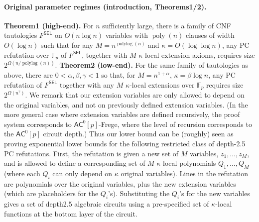 \paragraph{Original parameter regimes (introduction, Theorems1/2).}
\textbf{Theorem1 (high-end).} For $n$ sufficiently large, there is a family of CNF tautologies $F^{\mathsf{SEL}}$ on $O(n\log n)$ variables with $\operatorname{poly}(n)$ clauses of width $O(\log n)$ such that for any $M=n^{\operatorname{polylog}(n)}$ and $\kappa=O(\log\log n)$, any PC refutation over $\mathbb F_p$ of $F^{\mathsf{SEL}}$, together with $M$ $\kappa$-local extension axioms, requires size $2^{\Omega(n/\operatorname{polylog}(n))}$.
\textbf{Theorem2 (low-end).} For the same family of tautologies as above, there are $0<\alpha,\beta,\gamma<1$ so that, for $M=n^{1+\alpha}$, $\kappa=\beta\log n$, any PC refutation of $F^{\mathsf{SEL}}$ together with any $M$ $\kappa$-local extensions over $\mathbb F_p$ requires size $2^{\Omega(n^{\gamma})}$.
We remark that our extension variables are only allowed to depend on the original variables, and not on previously defined extension variables. (In the more general case where extension variables are defined recursively, the proof system corresponds to $\mathsf{AC}^0[p]$-Frege, where the level of recursion corresponds to the $\mathsf{AC}^0[p]$ circuit depth.) Thus our lower bound can be (roughly) seen as proving exponential lower bounds for the following restricted class of depth-2.5 PC refutations. First, the refutation is given a new set of $M$ variables, $z_1,\ldots,z_M$, and is allowed to define a corresponding set of $M$ $\kappa$-local polynomials $Q_1,\ldots,Q_M$ (where each $Q_i$ can only depend on $\kappa$ original variables). Lines in the refutation are polynomials over the original variables, plus the new extension variables (which are placeholders for the $Q_i$'s). Substituting the $Q_i$'s for the new variables gives a set of depth2.5 algebraic circuits using a pre-specified set of $\kappa$-local functions at the bottom layer of the circuit.
